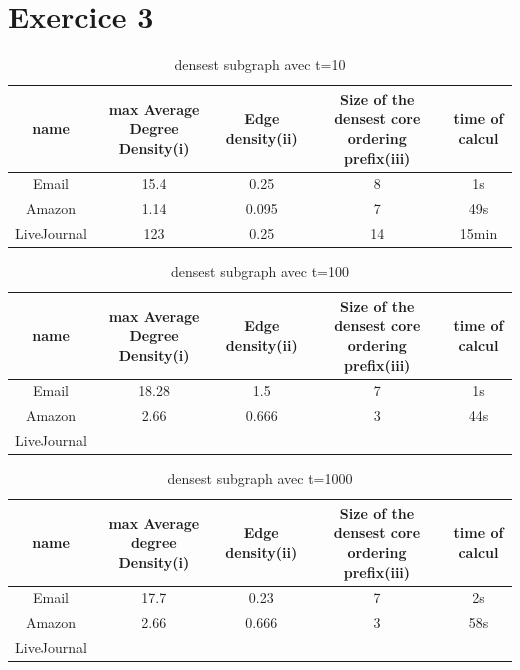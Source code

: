 \documentclass[a4paper,10pt]{report}
\begin{document}
\section{Exercice 3}

\begin{table}[ht]
\caption{densest subgraph avec t=10}
\centering
\begin{tabular}{|c c c c c|}
\hline\hline
name & max Average Degree Density(i)&Edge density(ii)&Size of the densest core ordering prefix(iii) & time of calcul \\[0.5ex]
\hline

Email & 15.4 & 0.25 & 8 & 1s \\
Amazon & 1.14 & 0.095 & 7 & 49s \\
LiveJournal & 123 & 0.25 &  14 & 15min &   \\

\hline
\end{tabular}
\label {table:nonlin}
\end{table}

\begin{table}[ht]
\caption{densest subgraph avec t=100}
\centering
\begin{tabular}{|c c c c c|}
\hline\hline
name & max Average Degree Density(i)&Edge density(ii)&Size of the densest core ordering prefix(iii) & time of calcul \\[0.5ex]
\hline

Email & 18.28 & 1.5 & 7 & 1s \\
Amazon & 2.66 & 0.666 & 3 & 44s \\
LiveJournal & &  &  &   \\

\hline
\end{tabular}
\label {table:nonlin}
\end{table}

\begin{table}[ht]
\caption{densest subgraph avec t=1000}
\centering
\begin{tabular}{|c c c c c|}
\hline\hline
name & max Average degree Density(i)&Edge density(ii)&Size of the densest core ordering prefix(iii) & time of calcul \\[0.5ex]
\hline

Email & 17.7 & 0.23 & 7 & 2s \\
Amazon & 2.66 & 0.666 & 3 & 58s \\
LiveJournal & &  &  &   \\

\hline
\end{tabular}
\label {table:nonlin}
\end{table}
\end{document}
